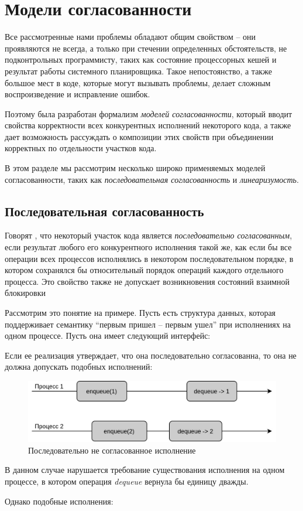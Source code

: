\documentclass[14pt, openany]{book}
\begin{document}
\section{Модели согласованности}
Все рассмотренные нами проблемы обладают общим свойством -- они проявляются не всегда, а только при стечении определенных обстоятельств, не подконтрольных программисту, таких как состояние процессорных кешей и результат работы системного планировщика. Такое непостоянство, а также большое мест в коде, которые могут вызывать проблемы, делает сложным воспроизведение и исправление ошибок. \par
Поэтому была разработан формализм \textit{моделей согласованности}, который вводит свойства корректности всех конкурентных исполнений некоторого кода, а также дает возможность рассуждать о композиции этих свойств при объединении корректных по отдельности участков кода. \par
В этом разделе мы рассмотрим несколько широко применяемых моделей согласованности, таких как \textit{последовательная согласованность} и \textit{линеаризумость}.
\subsection{Последовательная согласованность}
Говорят \cite{sequential}, что некоторый участок кода является \textit{последовательно согласованным}, если результат любого его конкурентного исполнения такой же, как если бы все операции всех процессов исполнялись в некотором последовательном порядке, в котором сохранялся бы относительный порядок операций каждого отдельного процесса. Это свойство также не допускает возникновения состояний взаимной блокировки \par
Рассмотрим это понятие на примере. Пусть есть структура данных, которая поддерживает семантику ``первым пришел -- первым ушел''  при исполнениях на одном процессе. Пусть она имеет следующий интерфейс:

Если ее реализация утверждает, что она последовательно согласованна, то она не должна допускать подобных исполнений: 

\begin{figure}[h]
\caption{Последовательно не согласованное исполнение}
\vspace{2mm}
\centering
\includegraphics[scale=0.4]{NonSequential.jpg}
\end{figure}
В данном случае нарушается требование существования исполнения на одном процессе, в котором операция \textit{dequeue} вернула бы единицу дважды. \par
Однако подобные исполнения: 
\end{document}
